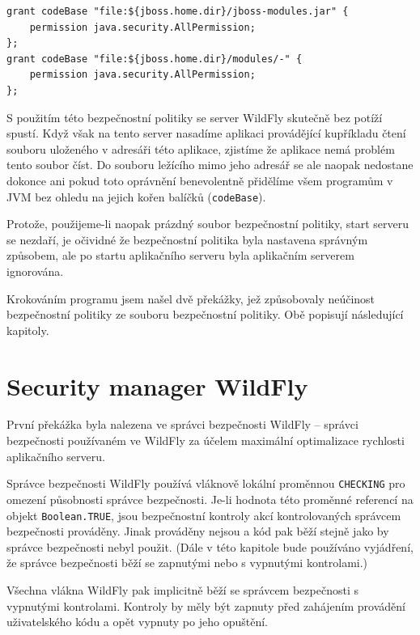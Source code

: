\begin{verbatim}
grant codeBase "file:${jboss.home.dir}/jboss-modules.jar" {
    permission java.security.AllPermission;
};
grant codeBase "file:${jboss.home.dir}/modules/-" {
    permission java.security.AllPermission;
};
\end{verbatim}

S použitím této bezpečnostní politiky se server WildFly skutečně bez potíží spustí. Když však na tento server nasadíme aplikaci provádějící kupříkladu čtení souboru uloženého v adresáři této aplikace, zjistíme že aplikace nemá problém tento soubor číst. Do souboru ležícího mimo jeho adresář se ale naopak nedostane dokonce ani pokud toto oprávnění benevolentně přidělíme všem programům v JVM bez ohledu na jejich kořen balíčků ({\tt codeBase}).

Protože, použijeme-li naopak prázdný soubor bezpečnostní politiky, start serveru se nezdaří, je očividné že bezpečnostní politika byla nastavena správným způsobem, ale po startu aplikačního serveru byla aplikačním serverem ignorována.

Krokováním programu jsem našel dvě překážky, jež způsobovaly neúčinost bezpečnostní politiky ze souboru bezpečnostní politiky. Obě popisují následující kapitoly.

\section{Security manager WildFly}

První překážka byla nalezena ve správci bezpečnosti WildFly -- správci bezpečnosti používaném ve WildFly za účelem maximální optimalizace rychlosti aplikačního serveru.

Správce bezpečnosti WildFly používá vláknově lokální proměnnou {\tt CHECKING} pro omezení působnosti správce bezpečnosti. Je-li hodnota této proměnné referencí na objekt {\tt Boolean.TRUE}, jsou bezpečnostní kontroly akcí kontrolovaných správcem bezpečnosti prováděny. Jinak prováděny nejsou a kód pak běží stejně jako by správce bezpečnosti nebyl použit. \cite{sourceWildFlySecurityManager} (Dále v této kapitole bude používáno vyjádření, že správce bezpečnosti běží se zapnutými nebo s vypnutými kontrolami.)

Všechna vlákna WildFly pak implicitně běží se správcem bezpečnosti s vypnutými kontrolami. Kontroly by měly být zapnuty před zahájením provádění uživatelského kódu a opět vypnuty po jeho opuštění. \cite{sourceWildFlySecurityManager}

